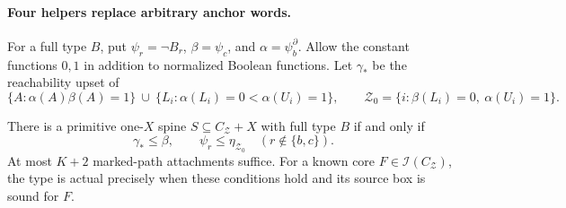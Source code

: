 \paragraph{Four helpers replace arbitrary anchor words.}
For a full type $B$, put $\psi_r=\neg B_r$,
$\beta=\psi_c$, and $\alpha=\psi_b^\partial$.
Allow the constant functions $0,1$ in addition to normalized Boolean
functions. Let $\gamma_*$ be the reachability upset of
\[
 \{A:\alpha(A)\beta(A)=1\}
 \ \cup\ \{L_i:\alpha(L_i)=0<\alpha(U_i)=1\},
 \qquad
 \mathcal Z_0=\{i:\beta(L_i)=0,\ \alpha(U_i)=1\}.
\]

\begin{theorem}
\label{core:thm:pair-interval-types}
There is a primitive one-$X$ spine $S\subseteq C_{\mathcal Z}+X$
with full type $B$ if and only if
\[
 \gamma_*\leq\beta,
 \qquad \psi_r\leq\eta_{\mathcal Z_0}\quad(r\notin\{b,c\}).
\]
At most $K+2$ marked-path attachments suffice. For a known core
$F\in\mathcal I(C_{\mathcal Z})$, the type is actual precisely when
these conditions hold and its source box is sound for $F$.
\end{theorem}
